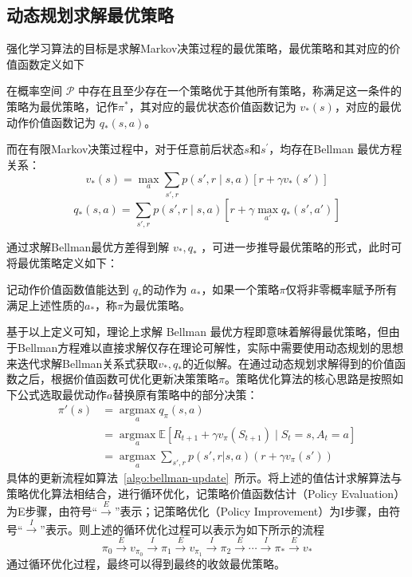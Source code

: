 \subsection{动态规划求解最优策略}

强化学习算法的目标是求解Markov决策过程的最优策略，最优策略和其对应的价值函数定义如下
\begin{definition}
    在概率空间 $\mathcal{P}$ 中存在且至少存在一个策略优于其他所有策略，称满足这一条件的策略为最优策略，记作$\pi^*$，其对应的最优状态价值函数记为 $v_*(s)$，对应的最优动作价值函数记为 $q_*(s,a)$。
\end{definition}

而在有限Markov决策过程中，对于任意前后状态$s$和$s^\prime$，均存在Bellman 最优方程关系\cite{white1963dynamic}：
\begin{equation}\label{eq:v_star}
    v_*(s)=\max_{a}\sum_{s',r}p(s',r \mid s,a)[r+\gamma v_*(s')]
\end{equation}
\begin{equation}\label{eq:q_star}
q_*(s,a) = \sum_{s',r}p(s',r \mid s,a)\left[r+\gamma \max_{a'}q_*(s',a') \right]
\end{equation}

通过求解Bellman最优方差得到解 $v_*,q_*$ ，可进一步推导最优策略的形式，此时可将最优策略定义如下：
\begin{definition}
    记动作价值函数值能达到 $q_*$的动作为 $a_*$，如果一个策略$\pi$仅将非零概率赋予所有满足上述性质的$a_*$，称$\pi$为最优策略。
\end{definition}

基于以上定义可知，理论上求解 Bellman 最优方程即意味着解得最优策略，但由于Bellman方程难以直接求解仅存在理论可解性，实际中需要使用动态规划的思想来迭代求解Bellman关系式获取$v_*,q_*$的近似解\cite{sutton2018reinforcement}。在通过动态规划求解得到的价值函数之后，根据价值函数可优化更新决策策略$\pi$。策略优化算法的核心思路是按照如下公式选取最优动作$a$替换原有策略中的部分决策：
\begin{equation}
    \begin{aligned}\pi'(s) &= \mathop{\arg\max}\limits_a q_\pi(s, a)\\&=\mathop{\arg\max}\limits_a \mathbb{E}[R_{t+1}+\gamma v_\pi(S_{t+1})\mid S_t=s,A_t=a] \\&= \mathop{\arg\max}\limits_a \sum_{s',r} p(s', r | s, a) (r + \gamma v_\pi(s'))\end{aligned}
\end{equation}
具体的更新流程如算法~\ref{algo:bellman-update}~所示。将上述的值估计求解算法与策略优化算法相结合，进行循环优化，记策略价值函数估计（Policy Evaluation）为E步骤，由符号“$\xrightarrow{E}$”表示；记策略优化（Policy Improvement）为I步骤，由符号“$\xrightarrow{I}$”表示。则上述的循环优化过程可以表示为如下所示的流程
\begin{equation}
\pi_0 \xrightarrow{E} v_{\pi_0} \xrightarrow{I}\pi_1 \xrightarrow{E} v_{\pi_1} \xrightarrow{I} \pi_2 \xrightarrow{E} \cdots \xrightarrow{I} \pi_* \xrightarrow{E} v_*
\end{equation}
通过循环优化过程，最终可以得到最终的收敛最优策略。

